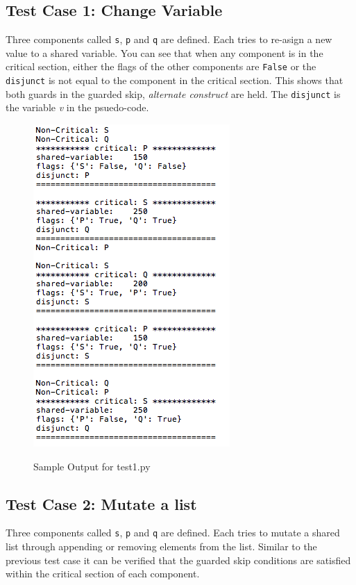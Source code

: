 \documentclass[18pt]{extarticle}
\begin{document}
\subsection*{Test Case 1: Change Variable}
 Three components called \texttt{s}, \texttt{p} and \texttt{q} are defined. Each tries to re-asign a new value to a shared variable. \newline
 You can see that when any component is in the critical section, either the flags of the other components are \texttt{False} or the \texttt{disjunct} is not equal to the component in the critical section. This shows that both guards in the guarded skip, \textit{alternate construct} are held. The \texttt{disjunct} is the variable \textsl{v} in the psuedo-code.
\begin{figure}[h]
  \includegraphics[scale=0.7]{t1}
  \label{fig:  }
 \caption{Sample Output for test1.py}
\end{figure}

\newpage
\subsection*{Test Case 2: Mutate a list}
Three components called \texttt{s}, \texttt{p} and \texttt{q} are defined. Each tries to mutate a shared list through appending or removing elements from the list.
Similar to the previous test case it can be verified that the guarded skip conditions are satisfied within the critical section of each component.
\end{document}
